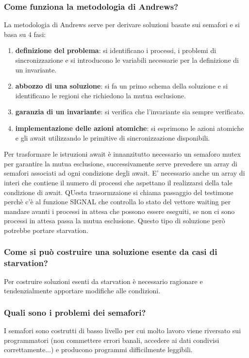 \documentclass{article}
\begin{document}
\subsubsection{Come funziona la metodologia di Andrews?}
La metodologia di Andrews serve per derivare soluzioni basate sui semafori e si
basa su 4 fasi:
\begin{enumerate}
    \item \textbf{definizione del problema}: si identificano i processi, i problemi di sincronizzazione e si introducono le variabili necessarie per la definizione di un invariante.
    \item \textbf{abbozzo di una soluzione}: si fa un primo schema della soluzione e si identificano le regioni che richiedono la mutua esclusione.
    \item \textbf{garanzia di un invariante}: si verifica che l'invariante sia sempre verificato.
    \item \textbf{implementazione delle azioni atomiche}: si esprimono le azioni atomiche e gli await utilizzando le primitive di sincronizzazione disponibili.
\end{enumerate}

Per trasformare le istruzioni await è innanzitutto necessario un semaforo mutex
per garantire la mutua esclusione, successivamente serve prevedere un array di
semafori associati ad ogni condizione degli await. E' necessario anche un array
di interi che contiene il numero di processi che aspettano il realizzarsi della
tale condizione di await. QUesta trasormzaione si chiama passaggio del
testimone perchè c'è al funzione SIGNAL che controlla lo stato del vettore
waiting per mandare avanti i processi in attesa che possono essere eseguiti, se
non ci sono processi in attesa passa la mutua esclusione. Questo tipo di
soluzione però potrebbe portare starvation.

\subsubsection{Come si può costruire una soluzione esente da casi di starvation?}
Per costruire soluzioni esenti da starvation è necessario ragionare e
tendenzialmente apportare modifiche alle condizioni.
\subsubsection{Quali sono i problemi dei semafori?}
I semafori sono costrutti di basso livello per cui molto lavoro viene riversato
sui programmatori (non commettere errori banali, accedere ai dati condivisi
correttamente...) e producono programmi difficilmente leggibili.
\end{document}
